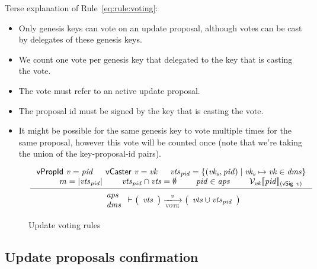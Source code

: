 Terse explanation of Rule~\ref{eq:rule:voting}:
\begin{itemize}
\item Only genesis keys can vote on an update proposal, although votes can be
  cast by delegates of these genesis keys.
\item We count one vote per genesis key that delegated to the key that is
  casting the vote.
\item The vote must refer to an active update proposal.
\item The proposal id must be signed by the key that is casting the vote.
\item It might be possible for the same genesis key to vote multiple times for
  the same proposal, however this vote will be counted once (note that we're
  taking the union of the key-proposal-id pairs).
\end{itemize}


\begin{figure}[htb]
  \begin{equation}
    \label{eq:rule:voting}
    \inference
    {
      \vPropId{v} = \var{pid} &  \vCaster{v} = \var{vk} &
      \var{vts}_{\var{pid}} =
      \{ (\var{vk_s}, \var{pid}) \mid \var{vk_s} \mapsto \var{vk} \in \var{dms} \}\\
      & m = \size{\var{vts}_{\var{pid}}}
      & \var{vts}_{\var{pid}} \cap \var{vts} = \emptyset
      & \var{pid} \in \var{aps} &
      \mathcal{V}_{\var{vk}}\serialised{\var{pid}}_{(\vSig{v})}\\
    }
    {
      {
        \begin{array}{l}
          \var{aps}\\
          \var{dms}
        \end{array}
      }
      \vdash
      {
        \left(
          \begin{array}{l}
            \var{vts}
          \end{array}
        \right)
      }
      \trans{vote}{\var{v}}
      {
        \left(
          \begin{array}{l}
            \var{vts} \cup \var{vts}_{\var{pid}}\\
          \end{array}
        \right)
      }
    }
  \end{equation}
  \caption{Update voting rules}
  \label{fig:rules:voting}
\end{figure}

\clearpage

\subsection{Update proposals confirmation}
\label{sec:update-proposals-confirmation}

